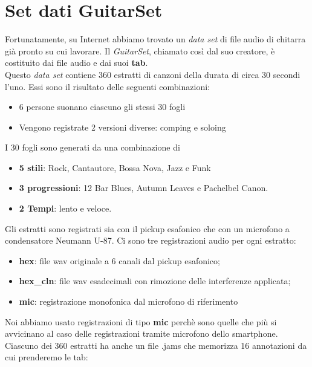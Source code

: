 \section{Set dati GuitarSet}
Fortunatamente, su Internet abbiamo trovato un \textit{data set} di file audio di chitarra già pronto su cui lavorare. Il \textit{GuitarSet}, chiamato così dal suo creatore, è costituito dai file audio e dai suoi \textbf{tab}.\\
Questo \textit{data set} contiene 360 estratti di canzoni della durata di circa 30 secondi l'uno. Essi sono il risultato delle seguenti combinazioni:
\begin{itemize}
	\item 6 persone suonano ciascuno gli stessi 30 fogli
	\item Vengono registrate 2 versioni diverse: comping e soloing
\end{itemize}
I 30 fogli sono generati da una combinazione di
\begin{itemize}
	\item \textbf{5 stili}: Rock, Cantautore, Bossa Nova, Jazz e Funk
	\item \textbf{3 progressioni}: 12 Bar Blues, Autumn Leaves e Pachelbel Canon.
	\item \textbf{2 Tempi}: lento e veloce.
\end{itemize}
Gli estratti sono registrati sia con il pickup esafonico che con un microfono a condensatore Neumann U-87.
Ci sono tre registrazioni audio per ogni estratto:
\begin{itemize}
	\item \textbf{hex}: file wav originale a 6 canali dal pickup esafonico;
	\item \textbf{hex\_cln}: file wav esadecimali con rimozione delle interferenze applicata;
	\item \textbf{mic}: registrazione monofonica dal microfono di riferimento
\end{itemize}
Noi abbiamo usato registrazioni di tipo \textbf{mic} perchè sono quelle che più si avvicinano al caso delle registrazioni tramite microfono dello smartphone.\\
\newline
Ciascuno dei 360 estratti ha anche un file .jams che memorizza 16 annotazioni da cui prenderemo le tab:
